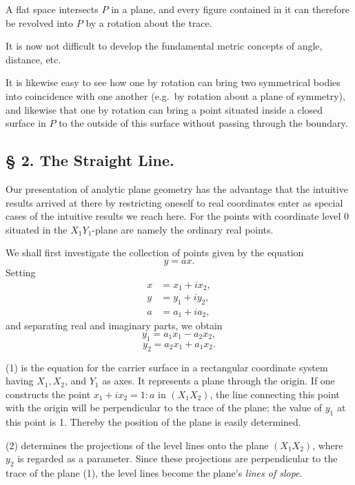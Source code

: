 \documentclass{article}
\begin{document}
A flat space intersects $P$ in a plane, and every figure contained in it can therefore be revolved into $P$ by a rotation about the trace.

It is now not difficult to develop the fundamental metric concepts of angle, distance, etc.

It is likewise easy to see how one by rotation can bring two symmetrical bodies into coincidence with one another (e.g.\ by rotation about a plane of symmetry), and likewise that one by rotation can bring a point situated inside a closed surface in $P$ to the outside of this surface without passing through the boundary.

\subsection*{§ 2. The Straight Line.}

Our presentation of analytic plane geometry has the advantage that the intuitive results arrived at there by restricting oneself to real coordinates enter as special cases of the intuitive results we reach here. For the points with coordinate level 0 situated in the $X_1 Y_1$-plane are namely the ordinary real points.

We shall first investigate the collection of points given by the equation
\[
y = ax.
\]
Setting
\[
\begin{aligned}
x &= x_1 + i x_2, \\
y &= y_1 + i y_2, \\
a &= a_1 + i a_2,
\end{aligned}
\]
and separating real and imaginary parts, we obtain
\[
y_1 = a_1 x_1 - a_2 x_2, \tag{1}
\]
\[
y_2 = a_2 x_1 + a_1 x_2. \tag{2}
\]

(1) is the equation for the carrier surface in a rectangular coordinate system having $X_1, X_2$, and $Y_1$ as axes. It represents a plane through the origin. If one constructs the point $x_1 + i x_2 = 1 : a$ in $(X_1 X_2)$, the line connecting this point with the origin will be perpendicular to the trace of the plane; the value of $y_1$ at this point is 1. Thereby the position of the plane is easily determined.

(2) determines the projections of the level lines onto the plane $(X_1 X_2)$, where $y_2$ is regarded as a parameter. Since these projections are perpendicular to the trace of the plane (1), the level lines become the plane's \emph{lines of slope}.
\end{document}
